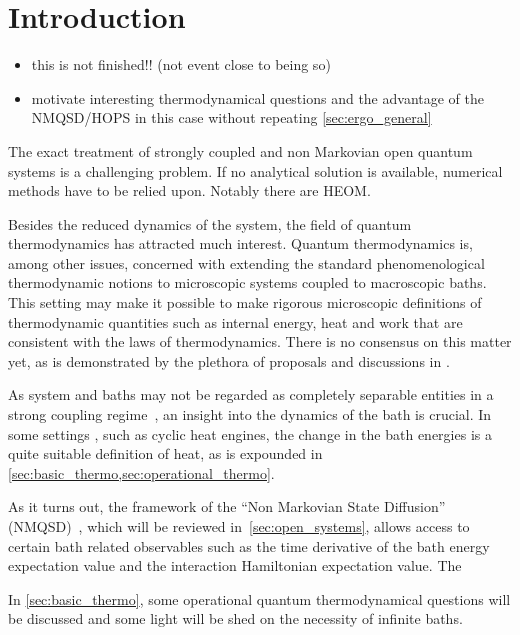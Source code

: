 \chapter{Introduction}
\label{chap:intro}
\begin{itemize}
\item this is not finished!! (not event close to being so)
\item motivate interesting thermodynamical questions and the advantage
  of the NMQSD/HOPS in this case without repeating \cref{sec:ergo_general}
\end{itemize}

The exact treatment of strongly coupled and non Markovian open quantum
systems is a challenging problem.  If no analytical solution is
available, numerical methods have to be relied upon. Notably there are
HEOM.

Besides the reduced dynamics of the system, the field of quantum
thermodynamics has attracted much interest. Quantum thermodynamics is,
among other issues, concerned with extending the standard
phenomenological thermodynamic notions to microscopic systems coupled
to macroscopic baths. This setting may make it possible to make
rigorous microscopic definitions of thermodynamic quantities such as
internal energy, heat and work that are consistent with the laws of
thermodynamics. There is no consensus on this matter yet, as is
demonstrated by the plethora of proposals and discussions in
\cite{Rivas2019Oct,Talkner2020Oct,Motz2018Nov,Wiedmann2020Mar,Senior2020Feb,Kato2015Aug,Kato2016Dec,Strasberg2021Aug,Talkner2016Aug,Bera2021Feb,Bera2021Jun,Esposito2015Dec}.

As system and baths may not be regarded as completely separable
entities in a strong coupling
regime~\cite{Rivas2019Oct,Esposito2015Dec}, an insight into the
dynamics of the bath is crucial. In some settings
\cite{Kato2016Dec,Lobejko2021Feb, Strasberg2021Aug}, such as cyclic
heat engines, the change in the bath energies is a quite suitable
definition of heat, as is expounded in
\cref{sec:basic_thermo,sec:operational_thermo}.

As it turns out, the framework of the ``Non Markovian State
Diffusion'' (NMQSD)~\cite{Diosi1998Mar}, which will be reviewed
in~\cref{sec:open_systems}, allows access to certain bath related
observables such as the time derivative of the bath energy expectation
value and the interaction Hamiltonian expectation value. The

In \cref{sec:basic_thermo}, some operational quantum thermodynamical
questions will be discussed and some light will be shed on the
necessity of infinite baths.

